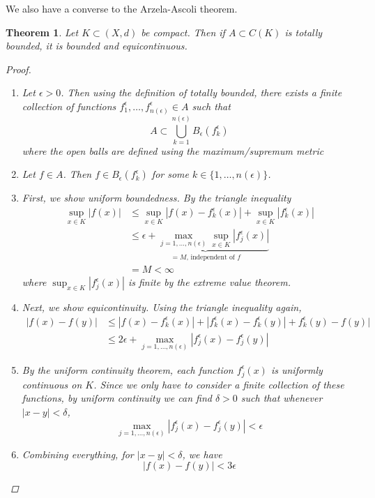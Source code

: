 \documentclass[12pt]{amsart}         %
\newtheorem{theorem}{Theorem}[section]
\theoremstyle{remark}
\begin{document}
We also have a converse to the Arzela-Ascoli theorem.
\begin{theorem} Let $K \subset (X, d)$ be compact. Then if $A \subset C(K)$ is totally bounded, it is bounded and equicontinuous.
\begin{proof}
\begin{enumerate}
\item Let $\epsilon > 0$. Then using the definition of totally bounded, there exists a finite collection of functions $f_1^{\epsilon}, \dots, f_{n(\epsilon)}^{\epsilon} \in A$ such that 
\[
A \subset \bigcup_{k=1}^{n(\epsilon)} B_{\epsilon}(f_k^{\epsilon})
\]
where the open balls are defined using the maximum/supremum metric
\item Let $f \in A$. Then $f \in B_{\epsilon} (f_k^\epsilon)$ for some $k \in \{1, \dots, n(\epsilon)\}$. 
\item First, we show uniform boundedness. By the triangle inequality
\begin{align*}
\sup_{x \in K}|f(x)| &\leq \sup_{x \in K}|f(x) - f_k^\epsilon(x)| +  \sup_{x \in K}|f_k^\epsilon(x)| \\
&\leq \underbrace{ \epsilon + \max_{j = 1, \dots, n(\epsilon)} \sup_{x \in K}|f_j^\epsilon(x)| }_{=M\text{, independent of $f$}} \\
&= M < \infty
\end{align*}
where $\sup_{x \in K}|f_j^\epsilon(x)|$ is finite by the extreme value theorem.
\item Next, we show equicontinuity. Using the triangle inequality again,
\begin{align*}
|f(x) - f(y)| &\leq |f(x) - f_k^\epsilon(x)| + |f_k^\epsilon(x) - f_k^\epsilon(y)| + f_k^\epsilon(y) - f(y)| \\
&\leq 2 \epsilon + \max_{j = 1, \dots, n(\epsilon)}|f_j^\epsilon(x) - f_j^\epsilon(y)|
\end{align*}
\item By the uniform continuity theorem, each function $f_j^\epsilon(x)$ is uniformly continuous on $K$. Since we only have to consider a finite collection of these functions, by uniform continuity we can find $\delta > 0$ such that whenever $|x - y| < \delta$,
\[
\max_{j = 1, \dots, n(\epsilon)}|f_j^\epsilon(x) - f_j^\epsilon(y)| < \epsilon
\]
\item Combining everything, for $|x - y| < \delta$, we have
\[
|f(x) - f(y)| < 3 \epsilon
\]
\end{enumerate}
\end{proof}
\end{theorem}
\end{document}
